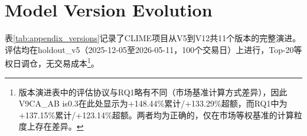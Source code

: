 \renewcommand{\arraystretch}{1}
\setlength{\tabcolsep}{6pt}
\endgroup

\section{Model Version Evolution}
\label{sec:appendix_versions}

表\ref{tab:appendix_versions}记录了CLIME项目从V5到V12共11个版本的完整演进。评估均在holdout\_v5（2025-12-05至2026-05-11，100个交易日）上进行，Top-20等权日调仓，无交易成本\footnote{版本演进表中的评估协议与RQ1略有不同（市场基准计算方式差异），因此V9CA\_AB is0.3在此处显示为+148.44\%累计/+133.29\%超额，而RQ1中为+137.15\%累计/+123.14\%超额。两者均为正确的，仅在市场等权基准的计算粒度上存在差异。}。

